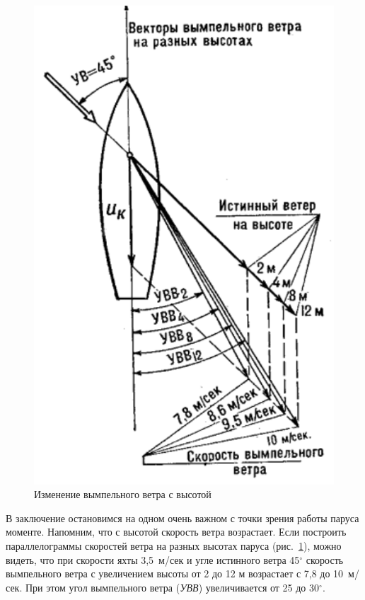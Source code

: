 \documentclass[a4paper, 12pt, twoside, final]{scrbook}
\begin{document}
\begin{figure}
	\centering
	\includegraphics[scale=1]{93_Izmenenie_vymp_vetra_s_vysotoj}
	\caption{Изменение вымпельного ветра с высотой}
	\label{fig:93}
\end{figure}


В заключение остановимся на одном очень важном с точки зрения работы паруса моменте. Напомним, что с высотой скорость ветра возрастает. Если построить параллелограммы скоростей ветра на разных высотах паруса (рис.~\ref{fig:93}), можно видеть, что при скорости яхты 3,5~м/сек и угле истинного ветра 45$^\circ$ скорость вымпельного ветра с увеличением высоты от 2 до 12 м возрастает с 7,8 до 10~м/сек. При этом угол вымпельного ветра (\textit{УВВ}) увеличивается от 25 до 30$^\circ$.
\end{document}

